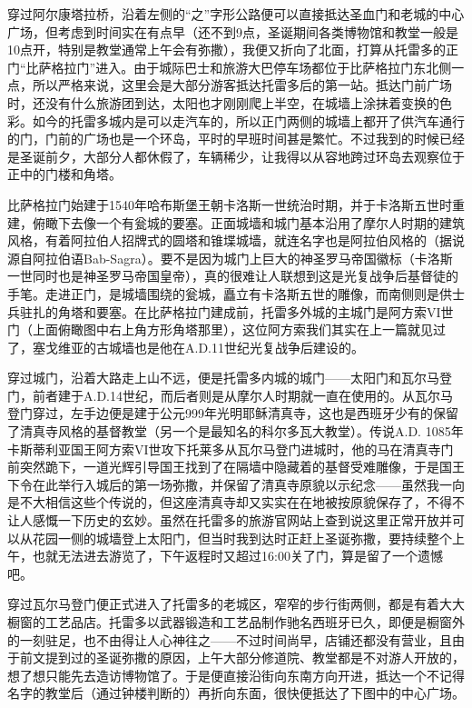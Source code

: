\documentclass[
]{book}
\begin{document}
穿过阿尔康塔拉桥，沿着左侧的``之''字形公路便可以直接抵达圣血门和老城的中心广场，但考虑到时间实在有点早（还不到9点，圣诞期间各类博物馆和教堂一般是10点开，特别是教堂通常上午会有弥撒），我便又折向了北面，打算从托雷多的正门``比萨格拉门''进入。由于城际巴士和旅游大巴停车场都位于比萨格拉门东北侧一点，所以严格来说，这里会是大部分游客抵达托雷多后的第一站。抵达门前广场时，还没有什么旅游团到达，太阳也才刚刚爬上半空，在城墙上涂抹着变换的色彩。如今的托雷多城内是可以走汽车的，所以正门两侧的城墙上都开了供汽车通行的门，门前的广场也是一个环岛，平时的早班时间甚是繁忙。不过我到的时候已经是圣诞前夕，大部分人都休假了，车辆稀少，让我得以从容地跨过环岛去观察位于正中的门楼和角塔。

比萨格拉门始建于1540年哈布斯堡王朝卡洛斯一世统治时期，并于卡洛斯五世时重建，俯瞰下去像一个有瓮城的要塞。正面城墙和城门基本沿用了摩尔人时期的建筑风格，有着阿拉伯人招牌式的圆塔和锥堞城墙，就连名字也是阿拉伯风格的（据说源自阿拉伯语Bab-Sagra）。要不是因为城门上巨大的神圣罗马帝国徽标（卡洛斯一世同时也是神圣罗马帝国皇帝），真的很难让人联想到这是光复战争后基督徒的手笔。走进正门，是城墙围绕的瓮城，矗立有卡洛斯五世的雕像，而南侧则是供士兵驻扎的角塔和要塞。在比萨格拉门建成前，托雷多外城的主城门是阿方索VI世门（上面俯瞰图中右上角方形角塔那里），这位阿方索我们其实在上一篇就见过了，塞戈维亚的古城墙也是他在A.D.11世纪光复战争后建设的。

穿过城门，沿着大路走上山不远，便是托雷多内城的城门------太阳门和瓦尔马登门，前者建于A.D.14世纪，而后者则是从摩尔人时期就一直在使用的。从瓦尔马登门穿过，左手边便是建于公元999年光明耶稣清真寺，这也是西班牙少有的保留了清真寺风格的基督教堂（另一个是最知名的科尔多瓦大教堂）。传说A.D. 1085年卡斯蒂利亚国王阿方索VI世攻下托莱多从瓦尔马登门进城时，他的马在清真寺门前突然跪下，一道光辉引导国王找到了在隔墙中隐藏着的基督受难雕像，于是国王下令在此举行入城后的第一场弥撒，并保留了清真寺原貌以示纪念------虽然我一向是不大相信这些个传说的，但这座清真寺却又实实在在地被按原貌保存了，不得不让人感慨一下历史的玄妙。虽然在托雷多的旅游官网站上查到说这里正常开放并可以从花园一侧的城墙登上太阳门，但当时我到达时正赶上圣诞弥撒，要持续整个上午，也就无法进去游览了，下午返程时又超过16:00关了门，算是留了一个遗憾吧。

穿过瓦尔马登门便正式进入了托雷多的老城区，窄窄的步行街两侧，都是有着大大橱窗的工艺品店。托雷多以武器锻造和工艺品制作驰名西班牙已久，即便是橱窗外的一刻驻足，也不由得让人心神往之------不过时间尚早，店铺还都没有营业，且由于前文提到过的圣诞弥撒的原因，上午大部分修道院、教堂都是不对游人开放的，想了想只能先去造访博物馆了。于是便直接沿街向东南方向开进，抵达一个不记得名字的教堂后（通过钟楼判断的）再折向东面，很快便抵达了下图中的中心广场。
\end{document}

